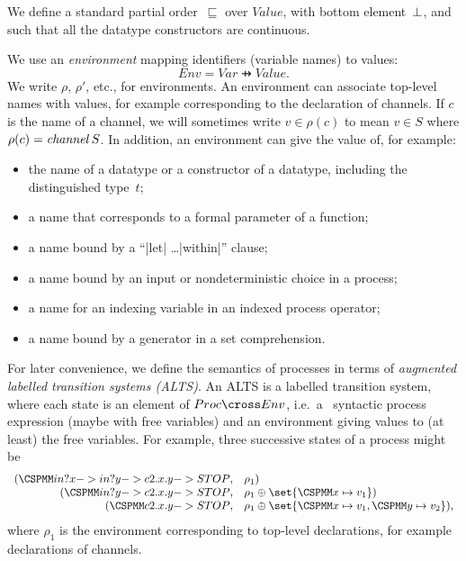 We define a standard partial order~$\sqsubseteq$ over $Value$, with bottom
element~$\perp$, and such that all the datatype constructors are continuous.



We use an \emph{environment} mapping identifiers (variable names) to values:
\[
Env = Var \pfun Value.
\]
We write $\rho$, $\rho'$, etc., for environments.  An environment can
associate top-level names with values, for example corresponding to the
declaration of channels.  If $c$ is the name of a channel, we will sometimes
write $v \in \rho(c)$ to mean $v \in S$ where $\rho(c) = \mathop{\it channel} S$.
In addition, an environment can give the value of, for example:
%
\begin{itemize}
\item the name of a datatype or a constructor of a datatype, including the
  distinguished type~$t$;
\item a name that corresponds to a formal parameter of a function;
\item a name bound by a ``|let| \ldots |within|'' clause;
\item a name bound by an input or nondeterministic choice in a process;
\item a name for an indexing variable in an indexed process operator;
\item a name bound by a generator in a set comprehension.
\end{itemize}

For later convenience, we define the semantics of processes in terms of
\emph{augmented labelled transition systems (ALTS)}.  An ALTS is a labelled
transition system, where each state is an element of $Proc \cross Env$, i.e.~a
\CSPm\ syntactic process expression (maybe with free variables) and an
environment giving values to (at least) the free variables.  For example,
three successive states of a process might be
\[
\begin{array}{rl}
(\M{in?x -> in?y -> c2.x.y -> STOP}, & \rho_1) \\
(\M{in?y -> c2.x.y -> STOP}, & \rho_1 \oplus \set{\M{x} \mapsto v_1}) \\
(\M{c2.x.y -> STOP}, & \rho_1 \oplus \set{\M x \mapsto v_1, \M y \mapsto v_2}),
\end{array}
\]
where $\rho_1$ is the environment corresponding to top-level declarations, for
example declarations of channels.  

